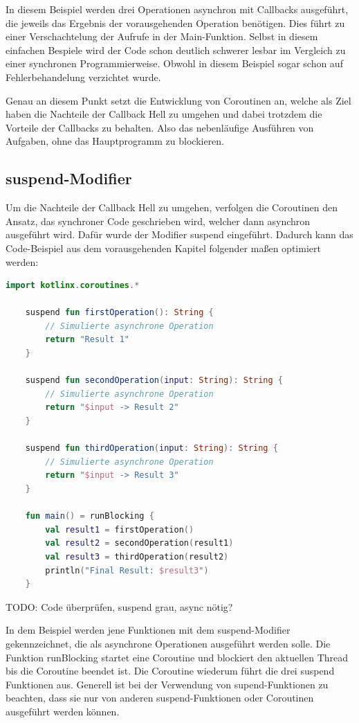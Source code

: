 \documentclass[fontsize=12pt,paper=a4,twoside=semi,parskip=half-,headsepline,headinclude]{scrreprt}
\begin{document}
In diesem Beispiel werden drei Operationen asynchron mit Callbacks ausgeführt, die jeweils das Ergebnis der vorausgehenden Operation benötigen. Dies führt zu einer Verschachtelung der Aufrufe in der Main-Funktion. Selbst in diesem einfachen Bespiele wird der Code schon deutlich schwerer lesbar im Vergleich zu einer synchronen Programmierweise. Obwohl in diesem Beispiel sogar schon auf Fehlerbehandelung verzichtet wurde.

Genau an diesem Punkt setzt die Entwicklung von Coroutinen an, welche als Ziel haben die Nachteile der Callback Hell zu umgehen und dabei trotzdem die Vorteile der Callbacks zu behalten. Also das nebenläufige Ausführen von Aufgaben, ohne das Hauptprogramm zu blockieren.


\subsection{suspend-Modifier}

Um die Nachteile der Callback Hell zu umgehen, verfolgen die Coroutinen den Ansatz, das synchroner Code geschrieben wird, welcher dann asynchron ausgeführt wird. Dafür wurde der Modifier suspend eingeführt. Dadurch kann das Code-Beispiel aus dem vorausgehenden Kapitel folgender maßen optimiert werden:

\begin{lstlisting}[language=Kotlin]
	import kotlinx.coroutines.*
	
	suspend fun firstOperation(): String {
		// Simulierte asynchrone Operation
		return "Result 1"
	}
	
	suspend fun secondOperation(input: String): String {
		// Simulierte asynchrone Operation
		return "$input -> Result 2"
	}
	
	suspend fun thirdOperation(input: String): String {
		// Simulierte asynchrone Operation
		return "$input -> Result 3"
	}
	
	fun main() = runBlocking {
		val result1 = firstOperation()
		val result2 = secondOperation(result1)
		val result3 = thirdOperation(result2)
		println("Final Result: $result3")
	}
\end{lstlisting}
TODO: Code überprüfen, suspend grau, async nötig?

In dem Beispiel werden jene Funktionen mit dem suspend-Modifier gekennzeichnet, die als asynchrone Operationen ausgeführt werden solle. Die Funktion runBlocking startet eine Coroutine und blockiert den aktuellen Thread bis die Coroutine beendet ist. Die Coroutine wiederum führt die drei suspend Funktionen aus. Generell ist bei der Verwendung von supend-Funktionen zu beachten, dass sie nur von anderen suspend-Funktionen oder Coroutinen ausgeführt werden können.
\end{document}
